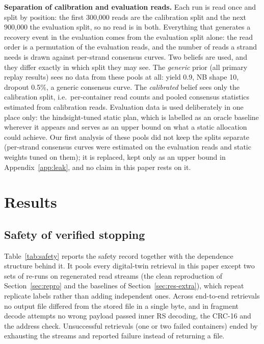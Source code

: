 \documentclass[acmsmall,screen]{acmart}
\begin{document}
\textbf{Separation of calibration and evaluation reads.}  Each run is read once and split by position: the first
300{,}000 reads are the calibration split and the next 900{,}000 the evaluation split, so no read is in
both.  Everything that generates a recovery event in the evaluation comes from the evaluation split
alone: the read order is a permutation of the evaluation reads, and the number of reads a strand needs
is drawn against per-strand consensus curves.  Two beliefs are used, and they differ exactly in which
split they may see.  The \emph{generic} prior (all primary replay results) sees no data from these pools
at all: yield 0.9, NB shape 10, dropout 0.5\%, a generic consensus curve.  The \emph{calibrated}
belief sees only the calibration split, i.e.\
per-container read counts and pooled consensus statistics estimated from calibration reads.  Evaluation
data is used deliberately in one place only: the hindsight-tuned static plan, which is labelled as an
oracle baseline wherever it appears and serves as an upper bound on what a static allocation could
achieve.  Our first analysis of these pools did not keep the splits separate (per-strand consensus
curves were estimated on the evaluation reads and static weights tuned on them); it is replaced, kept
only as an upper bound in Appendix~\ref{app:leak}, and no claim in this paper rests on it.

\section{Results}\label{sec:results}
\subsection{Safety of verified stopping}

Table~\ref{tab:safety} reports the safety record together with the dependence structure behind it.  It
pools every digital-twin retrieval in this paper except two sets of re-runs on regenerated read streams
(the clean reproduction of Section~\ref{sec:repro} and the baselines of Section~\ref{sec:res-extra}),
which repeat replicate labels rather than adding independent ones.  Across \SafeN{} end-to-end retrievals
no output file differed from the stored file in a single byte, and in \SafeAtt{} fragment decode attempts
no wrong payload passed inner RS decoding, the CRC-16 and the address check.  Unsuccessful retrievals
(one or two failed containers) ended by exhausting the streams and reported failure instead of returning
a file.
\end{document}
